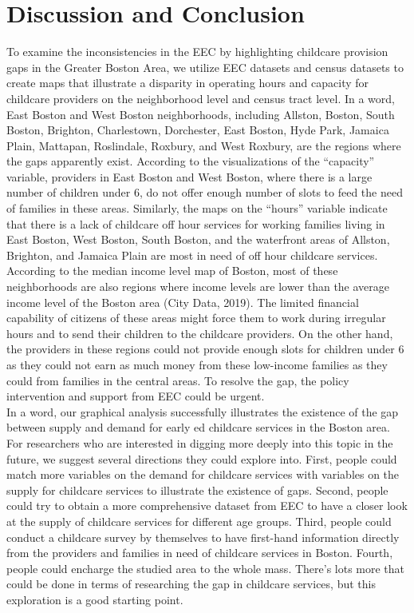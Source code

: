 \documentclass[10pt,letterpaper]{article}
\begin{document}
\section{Discussion and Conclusion}\label{discussion-and-conclusion}

To examine the inconsistencies in the EEC by highlighting childcare
provision gaps in the Greater Boston Area, we utilize EEC datasets and
census datasets to create maps that illustrate a disparity in operating
hours and capacity for childcare providers on the neighborhood level and
census tract level. In a word, East Boston and West Boston
neighborhoods, including Allston, Boston, South Boston, Brighton,
Charlestown, Dorchester, East Boston, Hyde Park, Jamaica Plain,
Mattapan, Roslindale, Roxbury, and West Roxbury, are the regions where
the gaps apparently exist. According to the visualizations of the
``capacity'' variable, providers in East Boston and West Boston, where
there is a large number of children under 6, do not offer enough number
of slots to feed the need of families in these areas. Similarly, the
maps on the ``hours'' variable indicate that there is a lack of
childcare off hour services for working families living in East Boston,
West Boston, South Boston, and the waterfront areas of Allston,
Brighton, and Jamaica Plain are most in need of off hour childcare
services. According to the median income level map of Boston, most of
these neighborhoods are also regions where income levels are lower than
the average income level of the Boston area (City Data, 2019). The
limited financial capability of citizens of these areas might force them
to work during irregular hours and to send their children to the
childcare providers. On the other hand, the providers in these regions
could not provide enough slots for children under 6 as they could not
earn as much money from these low-income families as they could from
families in the central areas. To resolve the gap, the policy
intervention and support from EEC could be urgent.\\
In a word, our graphical analysis successfully illustrates the existence
of the gap between supply and demand for early ed childcare services in
the Boston area. For researchers who are interested in digging more
deeply into this topic in the future, we suggest several directions they
could explore into. First, people could match more variables on the
demand for childcare services with variables on the supply for childcare
services to illustrate the existence of gaps. Second, people could try
to obtain a more comprehensive dataset from EEC to have a closer look at
the supply of childcare services for different age groups. Third, people
could conduct a childcare survey by themselves to have first-hand
information directly from the providers and families in need of
childcare services in Boston. Fourth, people could encharge the studied
area to the whole mass. There's lots more that could be done in terms of
researching the gap in childcare services, but this exploration is a
good starting point.
\end{document}
